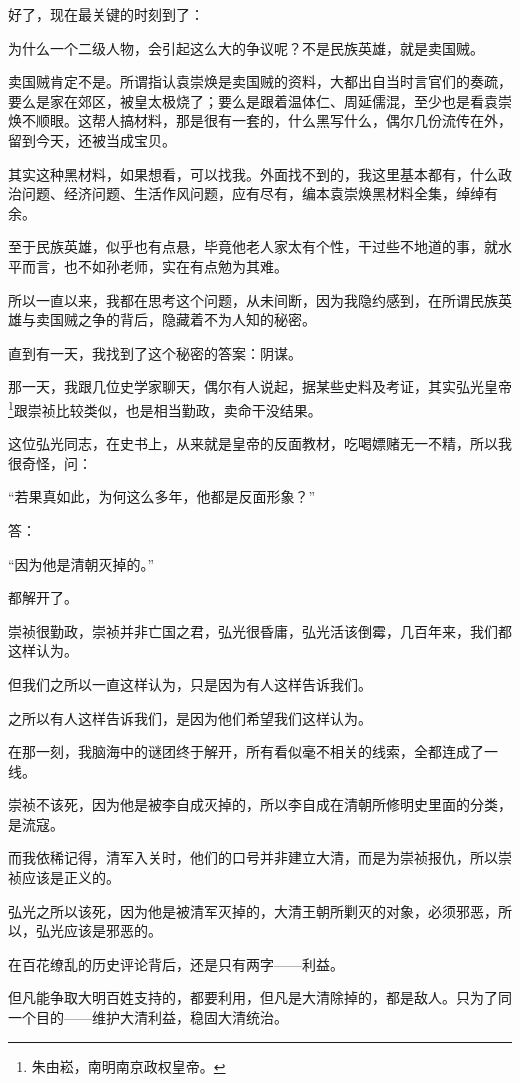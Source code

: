 \begin{multicols}{\theparacolNo}
		好了，现在最关键的时刻到了：

		为什么一个二级人物，会引起这么大的争议呢？不是民族英雄，就是卖国贼。

		卖国贼肯定不是。所谓指认袁崇焕是卖国贼的资料，大都出自当时言官们的奏疏，要么是家在郊区，被皇太极烧了；要么是跟着温体仁、周延儒混，至少也是看袁崇焕不顺眼。这帮人搞材料，那是很有一套的，什么黑写什么，偶尔几份流传在外，留到今天，还被当成宝贝。

		其实这种黑材料，如果想看，可以找我。外面找不到的，我这里基本都有，什么政治问题、经济问题、生活作风问题，应有尽有，编本袁崇焕黑材料全集，绰绰有余。

		至于民族英雄，似乎也有点悬，毕竟他老人家太有个性，干过些不地道的事，就水平而言，也不如孙老师，实在有点勉为其难。

		所以一直以来，我都在思考这个问题，从未间断，因为我隐约感到，在所谓民族英雄与卖国贼之争的背后，隐藏着不为人知的秘密。

		直到有一天，我找到了这个秘密的答案：阴谋。

		那一天，我跟几位史学家聊天，偶尔有人说起，据某些史料及考证，其实弘光皇帝\footnote{朱由崧，南明南京政权皇帝。}跟崇祯比较类似，也是相当勤政，卖命干没结果。

		这位弘光同志，在史书上，从来就是皇帝的反面教材，吃喝嫖赌无一不精，所以我很奇怪，问：

		“若果真如此，为何这么多年，他都是反面形象？”

		答：

		“因为他是清朝灭掉的。”

		都解开了。

		崇祯很勤政，崇祯并非亡国之君，弘光很昏庸，弘光活该倒霉，几百年来，我们都这样认为。

		但我们之所以一直这样认为，只是因为有人这样告诉我们。

		之所以有人这样告诉我们，是因为他们希望我们这样认为。

		在那一刻，我脑海中的谜团终于解开，所有看似毫不相关的线索，全都连成了一线。

		崇祯不该死，因为他是被李自成灭掉的，所以李自成在清朝所修明史里面的分类，是流寇。

		而我依稀记得，清军入关时，他们的口号并非建立大清，而是为崇祯报仇，所以崇祯应该是正义的。

		弘光之所以该死，因为他是被清军灭掉的，大清王朝所剿灭的对象，必须邪恶，所以，弘光应该是邪恶的。

		在百花缭乱的历史评论背后，还是只有两字——利益。

		但凡能争取大明百姓支持的，都要利用，但凡是大清除掉的，都是敌人。只为了同一个目的——维护大清利益，稳固大清统治。


\end{multicols}
